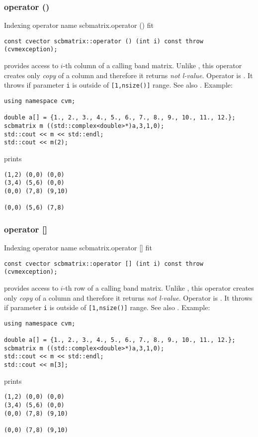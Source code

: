 \subsubsection{operator ()}
Indexing operator%
\pdfdest name {scbmatrix.operator ()} fit
\begin{verbatim}
const cvector scbmatrix::operator () (int i) const throw (cvmexception);
\end{verbatim}
provides access to \hbox{$i$-th} column of a calling band matrix.
Unlike ,
this operator creates only  \emph{copy} of a column and therefore 
it returns
\emph{not  l-value}.
Operator is \Based.
It throws 
if  parameter \verb"i" is outside of \verb"[1,nsize()]" range.
See also .
Example:
\begin{Verbatim}
using namespace cvm;

double a[] = {1., 2., 3., 4., 5., 6., 7., 8., 9., 10., 11., 12.};
scbmatrix m ((std::complex<double>*)a,3,1,0);
std::cout << m << std::endl;
std::cout << m(2);
\end{Verbatim}
prints
\begin{Verbatim}
(1,2) (0,0) (0,0)
(3,4) (5,6) (0,0)
(0,0) (7,8) (9,10)

(0,0) (5,6) (7,8)
\end{Verbatim}
\newpage



\subsubsection{operator []}
Indexing operator%
\pdfdest name {scbmatrix.operator []} fit
\begin{verbatim}
const cvector scbmatrix::operator [] (int i) const throw (cvmexception);
\end{verbatim}
provides access to  \hbox{$i$-th} row of a calling band matrix.
Unlike ,
this operator creates only  \emph{copy} of a column and therefore 
it returns
\emph{not  l-value}.
Operator is \Based.
It throws 
if parameter \verb"i" is outside of \verb"[1,nsize()]" range.
See also .
Example:
\begin{Verbatim}
using namespace cvm;

double a[] = {1., 2., 3., 4., 5., 6., 7., 8., 9., 10., 11., 12.};
scbmatrix m ((std::complex<double>*)a,3,1,0);
std::cout << m << std::endl;
std::cout << m[3];
\end{Verbatim}
prints
\begin{Verbatim}
(1,2) (0,0) (0,0)
(3,4) (5,6) (0,0)
(0,0) (7,8) (9,10)

(0,0) (7,8) (9,10)
\end{Verbatim}
\newpage




